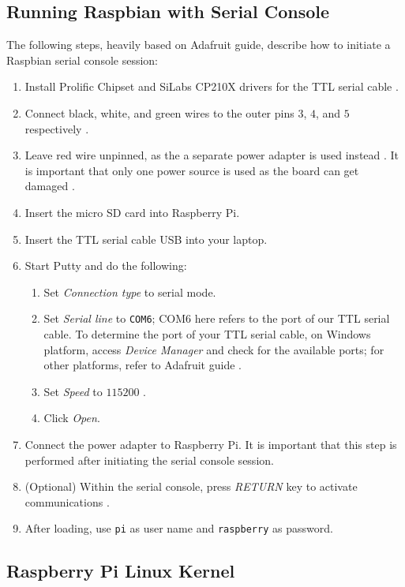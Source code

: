 \documentclass[onecolumn, oneside, letterpaper, draftclsnofoot, 10pt]{IEEEtran}
\begin{document}
\subsection{Running Raspbian with Serial Console} \label{rasp_setup}
The following steps, heavily based on Adafruit guide, describe how to initiate a Raspbian serial console session:
\begin{enumerate}
\item Install Prolific Chipset and SiLabs CP210X drivers for the TTL serial cable \cite{adafruit2}.
\item Connect black, white, and green wires to the outer pins $3$, $4$, and $5$ respectively \cite{adafruit1}.
\item Leave red wire unpinned, as the a separate power adapter is used instead \cite{adafruit1}. It is important that only one power source is used as the board can get damaged \cite{adafruit1}.
\item Insert the micro SD card into Raspberry Pi.
\item Insert the TTL serial cable USB into your laptop.
\item Start Putty and do the following:
\begin{enumerate}
\item Set \textit{Connection type} to serial mode.
\item Set \textit{Serial line} to \texttt{COM6}; {COM6} here refers to the port of our TTL serial cable. To determine the port of your TTL serial cable, on Windows platform, access \textit{Device Manager} and check for the available ports; for other platforms, refer to Adafruit guide \cite{adafruit1}.
\item Set \textit{Speed} to $115200$ \cite{adafruit1}.
\item Click \textit{Open}.
\end{enumerate}
\item Connect the power adapter to Raspberry Pi. It is important that this step is performed after initiating the serial console session.
\item (Optional) Within the serial console, press \textit{RETURN} key to activate communications \cite{adafruit1}.
\item After loading, use \texttt{pi} as user name and \texttt{raspberry} as password.
\end{enumerate}


\subsection{Raspberry Pi Linux Kernel}
\end{document}
